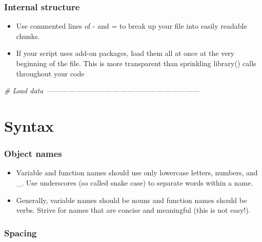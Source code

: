 \documentclass[
]{article}
\newenvironment{Shaded}{\begin{snugshade}}{\end{snugshade}}
\newcommand{\CommentTok}[1]{\textcolor[rgb]{0.56,0.35,0.01}{\textit{#1}}}
\providecommand{\tightlist}{%
  \setlength{\itemsep}{0pt}\setlength{\parskip}{0pt}}
\begin{document}
\hypertarget{internal-structure}{%
\subsubsection{Internal structure}\label{internal-structure}}

\begin{itemize}
\tightlist
\item
  Use commented lines of - and = to break up your file into easily
  readable chunks.
\item
  If your script uses add-on packages, load them all at once at the very
  beginning of the file. This is more transparent than sprinkling
  library() calls throughout your code
\end{itemize}

\begin{Shaded}
\begin{Highlighting}[]
\CommentTok{# Load data ---------------------------------------------------------------}
\end{Highlighting}
\end{Shaded}

\hypertarget{syntax}{%
\section{Syntax}\label{syntax}}

\hypertarget{object-names}{%
\subsubsection{Object names}\label{object-names}}

\begin{itemize}
\tightlist
\item
  Variable and function names should use only lowercase letters,
  numbers, and \_. Use underscores (so called snake case) to separate
  words within a name.
\item
  Generally, variable names should be nouns and function names should be
  verbs. Strive for names that are concise and meaningful (this is not
  easy!).
\end{itemize}

\hypertarget{spacing}{%
\subsubsection{Spacing}\label{spacing}}
\end{document}
